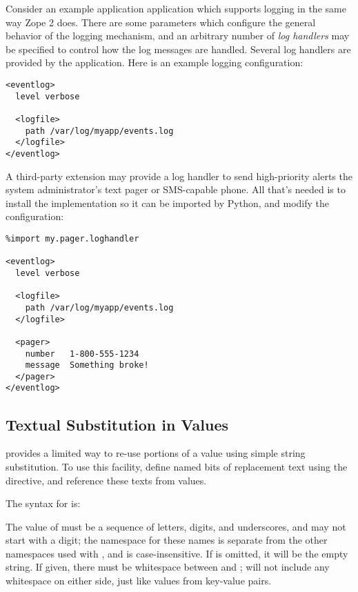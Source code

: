 \documentclass{howto}
\begin{document}
Consider an example application application which supports logging in
the same way Zope 2 does.  There are some parameters which configure
the general behavior of the logging mechanism, and an arbitrary number
of \emph{log handlers} may be specified to control how the log
messages are handled.  Several log handlers are provided by the
application.  Here is an example logging configuration:

\begin{verbatim}
<eventlog>
  level verbose

  <logfile>
    path /var/log/myapp/events.log
  </logfile>
</eventlog>
\end{verbatim}

A third-party extension may provide a log handler to send
high-priority alerts the system administrator's text pager or
SMS-capable phone.  All that's needed is to install the implementation
so it can be imported by Python, and modify the configuration:

\begin{verbatim}
%import my.pager.loghandler

<eventlog>
  level verbose

  <logfile>
    path /var/log/myapp/events.log
  </logfile>

  <pager>
    number   1-800-555-1234
    message  Something broke!
  </pager>
</eventlog>
\end{verbatim}


\subsection{Textual Substitution in Values}

 provides a limited way to re-use portions of a value
using simple string substitution.  To use this facility, define named
bits of replacement text using the  directive, and
reference these texts from values.

The syntax for  is:

\begin{alltt}
%define \var{name} \optional{\var{value}}
\end{alltt}

The value of  must be a sequence of letters, digits, and
underscores, and may not start with a digit; the namespace for these
names is separate from the other namespaces used with
, and is case-insensitive.  If  is
omitted, it will be the empty string.  If given, there must be
whitespace between  and ;  will not
include any whitespace on either side, just like values from key-value
pairs.
\end{document}
